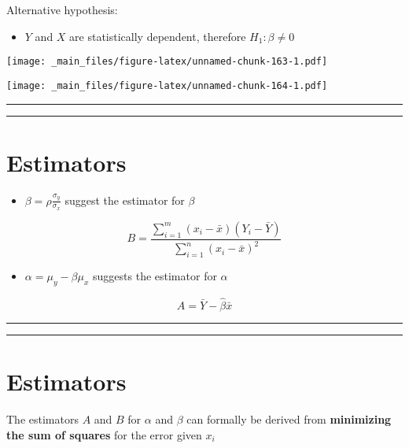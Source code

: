 \documentclass[
]{book}
\providecommand{\tightlist}{%
  \setlength{\itemsep}{0pt}\setlength{\parskip}{0pt}}
\begin{document}
Alternative hypothesis:

\begin{itemize}
\tightlist
\item
  \(Y\) and \(X\) are statistically dependent, therefore \(H_1: \beta\neq 0\)
\end{itemize}

\texttt{[image: \_main\_files/figure-latex/unnamed-chunk-163-1.pdf]}

\texttt{[image: \_main\_files/figure-latex/unnamed-chunk-164-1.pdf]}

\begin{center}\rule{0.5\linewidth}{0.5pt}\end{center}

\begin{center}\rule{0.5\linewidth}{0.5pt}\end{center}

\hypertarget{estimators-1}{%
\section{Estimators}\label{estimators-1}}

\begin{itemize}
\tightlist
\item
  \(\beta=\rho\frac{\sigma_y}{\sigma_x}\) suggest the estimator for \(\beta\)
\end{itemize}

\[B=\frac{\sum_{i=1}^m(x_i-\bar{x})(Y_i-\bar{Y})}{\sum_{i=1}^n(x_i-\bar{x})^2}\]

\begin{itemize}
\tightlist
\item
  \(\alpha=\mu_y-\beta\mu_x\) suggests the estimator for \(\alpha\)
\end{itemize}

\[A=\bar{Y}- \hat{\beta}\bar{x}\]

\begin{center}\rule{0.5\linewidth}{0.5pt}\end{center}

\begin{center}\rule{0.5\linewidth}{0.5pt}\end{center}

\hypertarget{estimators-2}{%
\section{Estimators}\label{estimators-2}}

The estimators \(A\) and \(B\) for \(\alpha\) and \(\beta\) can formally be derived from \textbf{minimizing the sum of squares} for the error given \(x_i\)
\end{document}
